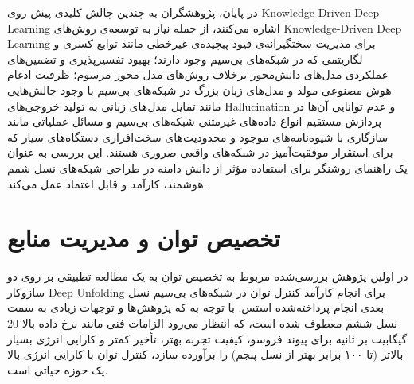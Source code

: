 در پایان، پژوهشگران به چندین چالش کلیدی پیش روی 
\gls{Knowledge-Driven Deep Learning}
 اشاره می‌کنند، از جمله نیاز به توسعه‌ی روش‌های 
\gls{Knowledge-Driven Deep Learning}
  برای مدیریت سختگیرانه‌ی قیود پیچیده‌ی غیرخطی مانند توابع کسری و لگاریتمی که در شبکه‌های بی‌سیم وجود دارند؛ بهبود تفسیرپذیری و تضمین‌های عملکردی مدل‌های دانش‌محور برخلاف روش‌های مدل-محور مرسوم؛ ظرفیت ادغام هوش مصنوعی مولد و مدل‌های زبان بزرگ در شبکه‌های بی‌سیم با وجود چالش‌هایی مانند تمایل مدل‌های زبانی به تولید خروجی‌های
\gls{Hallucination}
   و عدم توانایی آن‌ها در پردازش مستقیم انواع داده‌های غیرمتنی شبکه‌های بی‌سیم و مسائل عملیاتی مانند سازگاری با شیوه‌نامه‌های موجود و محدودیت‌های سخت‌افزاری دستگاه‌های سیار که برای استقرار موفقیت‌آمیز در شبکه‌های واقعی ضروری هستند. این بررسی به عنوان یک راهنمای روشنگر برای استفاده مؤثر از دانش دامنه در طراحی شبکه‌های نسل شمم هوشمند، کارآمد و قابل اعتماد عمل می‌کند
\cite{ComprehensiveSurvey}.



\section{تخصیص توان و مدیریت منابع}
در اولین پژوهش بررسی‌شده مربوط به تخصیص توان به 
یک مطالعه تطبیقی  بر روی دو سازوکار 
\gls{Deep Unfolding}
برای انجام کارآمد کنترل توان در شبکه‌های بی‌سیم نسل بعدی انجام پرداخته‌شده استس. با توجه به که پژوهش‌ها و توجهات زیادی به سمت نسل ششم معطوف شده است، که انتظار می‌رود الزامات فنی مانند نرخ داده بالا 20 گیگابیت بر ثانیه برای پیوند فروسو، کیفیت تجربه بهتر، تأخیر کمتر و کارایی انرژی بسیار بالاتر (تا ۱۰۰ برابر بهتر از نسل پنجم) را برآورده سازد، کنترل توان با کارایی انرژی بالا یک حوزه حیاتی است. 

